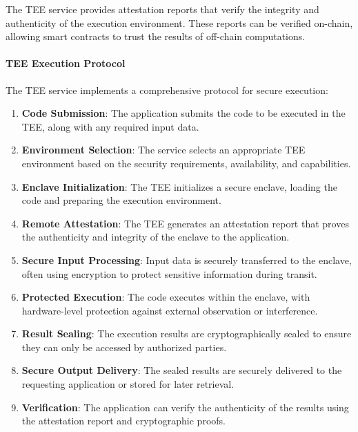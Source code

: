 \documentclass{article}
\begin{document}
The TEE service provides attestation reports that verify the integrity and authenticity of the execution environment. These reports can be verified on-chain, allowing smart contracts to trust the results of off-chain computations.

\paragraph{TEE Execution Protocol}
The TEE service implements a comprehensive protocol for secure execution:

\begin{enumerate}
    \item \textbf{Code Submission}: The application submits the code to be executed in the TEE, along with any required input data.
    
    \item \textbf{Environment Selection}: The service selects an appropriate TEE environment based on the security requirements, availability, and capabilities.
    
    \item \textbf{Enclave Initialization}: The TEE initializes a secure enclave, loading the code and preparing the execution environment.
    
    \item \textbf{Remote Attestation}: The TEE generates an attestation report that proves the authenticity and integrity of the enclave to the application.
    
    \item \textbf{Secure Input Processing}: Input data is securely transferred to the enclave, often using encryption to protect sensitive information during transit.
    
    \item \textbf{Protected Execution}: The code executes within the enclave, with hardware-level protection against external observation or interference.
    
    \item \textbf{Result Sealing}: The execution results are cryptographically sealed to ensure they can only be accessed by authorized parties.
    
    \item \textbf{Secure Output Delivery}: The sealed results are securely delivered to the requesting application or stored for later retrieval.
    
    \item \textbf{Verification}: The application can verify the authenticity of the results using the attestation report and cryptographic proofs.
\end{enumerate}
\end{document}
